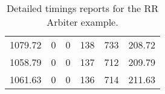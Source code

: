 \begin{table}[h]
{\begin{tabular}{cccccc}
            1079.72            & 0                          & 0                          & 138                        & 733                        & 208.72                 \\
            1058.79            & 0                          & 0                          & 137                        & 712                        & 209.79                 \\
            1061.63            & 0                          & 0                          & 136                        & 714                        & 211.63                 \\
            \bottomrule
        \end{tabular}
    }
    \caption{Detailed timings reports for the RR Arbiter example.}
\end{table}

